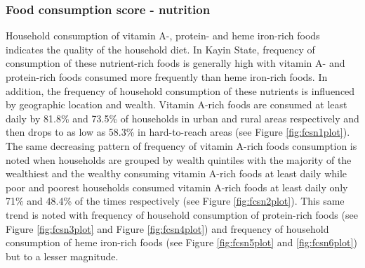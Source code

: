 \documentclass[12pt,a4paper]{article}
\begin{document}
\newpage

\hypertarget{fcsn-results}{%
\subsubsection{Food consumption score - nutrition}\label{fcsn-results}}

Household consumption of vitamin A-, protein- and heme iron-rich foods indicates the quality of the household diet. In Kayin State, frequency of consumption of these nutrient-rich foods is generally high with vitamin A- and protein-rich foods consumed more frequently than heme iron-rich foods. In addition, the frequency of household consumption of these nutrients is influenced by geographic location and wealth. Vitamin A-rich foods are consumed at least daily by 81.8\% and 73.5\% of households in urban and rural areas respectively and then drops to as low as 58.3\% in hard-to-reach areas (see Figure \ref{fig:fcsn1plot}). The same decreasing pattern of frequency of vitamin A-rich foods consumption is noted when households are grouped by wealth quintiles with the majority of the wealthiest and the wealthy consuming vitamin A-rich foods at least daily while poor and poorest households consumed vitamin A-rich foods at least daily only 71\% and 48.4\% of the times respectively (see Figure \ref{fig:fcsn2plot}). This same trend is noted with frequency of household consumption of protein-rich foods (see Figure \ref{fig:fcsn3plot} and Figure \ref{fig:fcsn4plot}) and frequency of household consumption of heme iron-rich foods (see Figure \ref{fig:fcsn5plot} and \ref{fig:fcsn6plot}) but to a lesser magnitude.
\end{document}
